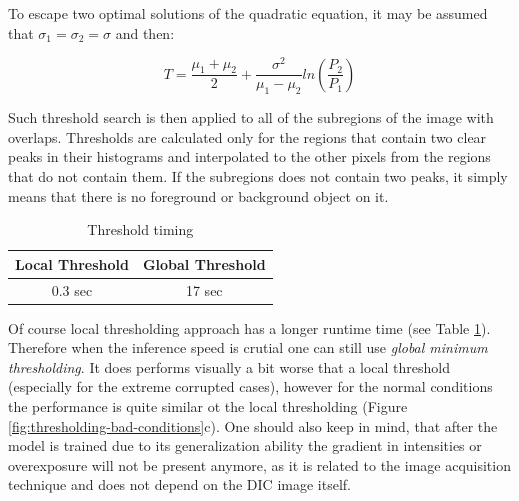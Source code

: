 To escape two optimal solutions of the quadratic equation, it may be assumed that $\sigma_1 = \sigma_2 = \sigma$ and then:

\begin{equation}
    T = \frac{\mu_1 + \mu_2}{2} + \frac{\sigma^2}{\mu_1 - \mu_2}ln\left(\frac{P_2}{P_1}\right)
\end{equation}

Such threshold search is then applied to all of the subregions of the image with overlaps. Thresholds are calculated only for the regions that contain two clear peaks in their histograms and interpolated to the other pixels from the regions that do not contain them. If the subregions does not contain two peaks, it simply means that there is no foreground or background object on it. 

\begin{table}[htb]
  \centering
      \begin{tabular}{||c c||} 
       \hline
       Local Threshold & Global Threshold \\ [0.5ex] 
       \hline\hline
       0.3 sec & 17 sec  \\ 
       \hline
      \end{tabular}
      \caption{Threshold timing}
      \label{table:threshold-timing}
  \end{table}
  
Of course local thresholding approach has a longer runtime time (see Table \ref{table:threshold-timing}). Therefore when the inference speed is crutial one can still use \textit{global minimum thresholding}. It does performs visually a bit worse that a local threshold (especially for the extreme corrupted cases), however for the normal conditions the performance is quite similar ot the local thresholding (Figure \ref{fig:thresholding-bad-conditions}c). One should also keep in mind, that after the model is trained due to its generalization ability the gradient in intensities or overexposure will not be present anymore, as it is related to the image acquisition technique and does not depend on the DIC image itself.


